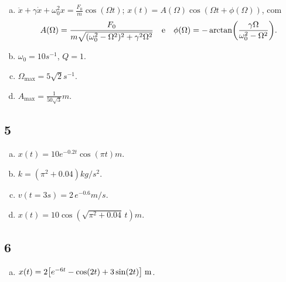 \documentclass[a4paper,10pt]{article}
\begin{document}
\begin{enumerate}[(a)]
\item $\ddot{x} + \gamma \dot{x} + \omega_0^2 x = \frac{F_0}{m} \cos(\Omega t)$;
$x(t) = A(\Omega) \cos(\Omega t + \phi(\Omega))$, com
$$
A(\Omega) = \frac{F_0}{m \sqrt{(\omega_0^2-\Omega^2)^2 + \gamma^2\Omega^2}}
\quad \mathrm{e} \quad
\phi(\Omega) = - \arctan(\frac{\gamma \Omega}{\omega_0^2 - \Omega^2}).
$$

\item $\omega_0 = 10 \unit{s^{-1}}$, $Q = 1$.

\item $\Omega_{\text{max}} = 5\sqrt{2} \unit{s^{-1}}$.

\item $A_{\text{max}} = \frac{1}{50\sqrt{3}} \unit{m}$.
\end{enumerate}


\subsection*{5}

\begin{enumerate}[(a)]
\item $x(t) = 10 e^{-0.2 t} \cos(\pi t) \unit{m}$.

\item $k = (\pi^2 + 0.04) \unit{kg/s^2}$.

\item $v(t = 3 \unit{s}) = 2 \, e^{-0.6} \unit{m/s}$.

\item $x(t) = 10 \cos(\sqrt{\pi^2 + 0.04} \, t) \unit{m}$.
\end{enumerate}

\subsection*{6}

\begin{enumerate}[(a)]
\item $x(t) = 2 \qty[e^{-6t} - \cos(2t) + 3 \sin(2t)] \; \mathrm{m}$.
\end{enumerate}
\end{document}
